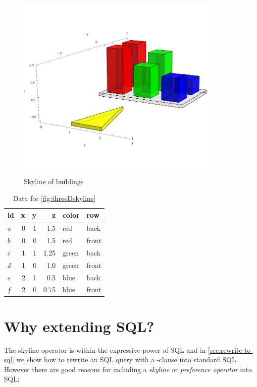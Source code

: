 \begin{figure}[h]
\centering
\includegraphics[width=100mm]{plots-misc/PlotSkyline3D}%
\caption{Skyline of buildings}%
\label{fig:threeDskyline}%
\end{figure}

\begin{table}[h]
\centering
\begin{tabular}{l|rrrll}
id & x & y & z & color & row\\
\hline
$a$ & 0 & 1 & 1.5 & red & back \\
$b$ & 0 & 0 & 1.5 & red & front \\
$c$ & 1 & 1 & 1.25 & green & back \\
$d$ & 1 & 0 & 1.0 & green & front \\
$e$ & 2 & 1 & 0.5 & blue & back \\
$f$ & 2 & 0 & 0.75 & blue & front
\end{tabular}
\caption{Data for \autoref{fig:threeDskyline}}
\label{tab:threeDskyline}
\end{table}

\section{Why extending SQL?}
The skyline operator is within the expressive power of SQL and in
\autoref{sec:rewrite-to-sql} we show how to rewrite an SQL query with
a -clause into standard SQL. 
However there are good reasons for including a \emph{skyline} or 
\emph{preference operator} into SQL:


